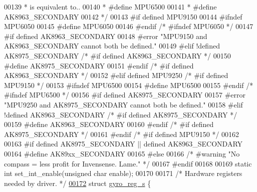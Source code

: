 \begin{DoxyCode}
00139 \textcolor{comment}{ * is equivalent to..}
00140 \textcolor{comment}{ * #define MPU6500}
00141 \textcolor{comment}{ * #define AK8963\_SECONDARY}
00142 \textcolor{comment}{ */}
00143 \textcolor{preprocessor}{#if defined MPU9150}
00144 \textcolor{preprocessor}{#ifndef MPU6050}
00145 \textcolor{preprocessor}{#define MPU6050}
00146 \textcolor{preprocessor}{#endif                          }\textcolor{comment}{/* #ifndef MPU6050 */}\textcolor{preprocessor}{}
00147 \textcolor{preprocessor}{#if defined AK8963\_SECONDARY}
00148 \textcolor{preprocessor}{#error "MPU9150 and AK8963\_SECONDARY cannot both be defined."}
00149 \textcolor{preprocessor}{#elif !defined AK8975\_SECONDARY }\textcolor{comment}{/* #if defined AK8963\_SECONDARY */}\textcolor{preprocessor}{}
00150 \textcolor{preprocessor}{#define AK8975\_SECONDARY}
00151 \textcolor{preprocessor}{#endif                          }\textcolor{comment}{/* #if defined AK8963\_SECONDARY */}\textcolor{preprocessor}{}
00152 \textcolor{preprocessor}{#elif defined MPU9250           }\textcolor{comment}{/* #if defined MPU9150 */}\textcolor{preprocessor}{}
00153 \textcolor{preprocessor}{#ifndef MPU6500}
00154 \textcolor{preprocessor}{#define MPU6500}
00155 \textcolor{preprocessor}{#endif                          }\textcolor{comment}{/* #ifndef MPU6500 */}\textcolor{preprocessor}{}
00156 \textcolor{preprocessor}{#if defined AK8975\_SECONDARY}
00157 \textcolor{preprocessor}{#error "MPU9250 and AK8975\_SECONDARY cannot both be defined."}
00158 \textcolor{preprocessor}{#elif !defined AK8963\_SECONDARY }\textcolor{comment}{/* #if defined AK8975\_SECONDARY */}\textcolor{preprocessor}{}
00159 \textcolor{preprocessor}{#define AK8963\_SECONDARY}
00160 \textcolor{preprocessor}{#endif                          }\textcolor{comment}{/* #if defined AK8975\_SECONDARY */}\textcolor{preprocessor}{}
00161 \textcolor{preprocessor}{#endif                          }\textcolor{comment}{/* #if defined MPU9150 */}\textcolor{preprocessor}{}
00162 
00163 \textcolor{preprocessor}{#if defined AK8975\_SECONDARY || defined AK8963\_SECONDARY}
00164 \textcolor{preprocessor}{#define AK89xx\_SECONDARY}
00165 \textcolor{preprocessor}{#else}
00166 \textcolor{comment}{/* #warning "No compass = less profit for Invensense. Lame." */}
00167 \textcolor{preprocessor}{#endif}
00168 
00169 \textcolor{keyword}{static} \textcolor{keywordtype}{int} set\_int\_enable(\textcolor{keywordtype}{unsigned} \textcolor{keywordtype}{char} enable);
00170 
00171 \textcolor{comment}{/* Hardware registers needed by driver. */}
\hypertarget{inv__mpu_8c_source.tex_l00172}{}\hyperlink{structgyro__reg__s}{00172} \textcolor{keyword}{struct }\hyperlink{structgyro__reg__s}{gyro\_reg\_s} \{

\end{DoxyCode}
